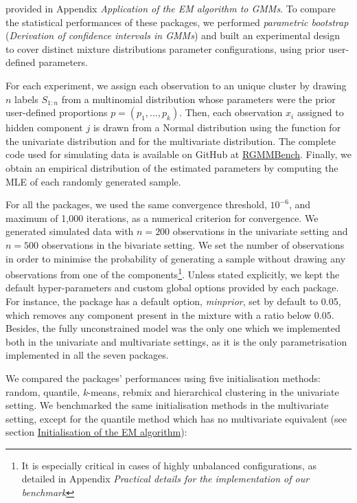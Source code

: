  provided in Appendix \emph{Application of the EM algorithm to GMMs}. To compare the statistical performances of these packages, we performed \emph{parametric bootstrap} (\emph{Derivation of confidence intervals in GMMs}) and built an experimental design to cover distinct mixture distributions parameter configurations, using prior user-defined parameters.

For each experiment, we assign each observation to an unique cluster by drawing \(n\) labels \(S_{1:n}\) from a multinomial distribution whose parameters were the prior user-defined proportions \(p=(p_1, \ldots, p_k)\). Then, each observation \(x_i\) assigned to hidden component \(j\) is drawn from a Normal distribution using the  function for the univariate distribution and  for the multivariate distribution. The complete code used for simulating data is
available on GitHub at \href{https://github.com/bastienchassagnol-servier/RGMMBench}{RGMMBench}. Finally, we obtain an empirical distribution of the estimated parameters by computing the MLE
of each randomly generated sample.

For all the packages, we used the same convergence threshold, \(10^{-6}\), and maximum of 1,000 iterations, as a numerical criterion for convergence. We generated simulated data with \(n = 200\) observations in the univariate setting and \(n = 500\) observations in the bivariate setting. We set the number of observations in order to minimise the probability of generating a sample without drawing any observations from one of the components\footnote{It is especially critical in cases of highly unbalanced configurations, as detailed in Appendix \emph{Practical details for the implementation of our benchmark}}. Unless stated explicitly, we kept the default hyper-parameters and custom global options provided by each package. For instance, the  package has a default option, \emph{minprior}, set by default to 0.05, which removes any component present in the mixture with a ratio below \(0.05\). Besides, the fully unconstrained model was the only one which we implemented both in the univariate and multivariate settings, as it is the only parametrisation implemented in all the seven packages.

We compared the packages' performances using five
initialisation methods: random, quantile, \emph{k}-means, rebmix and hierarchical clustering in the univariate setting. We benchmarked the same initialisation methods in the multivariate setting, except for the quantile method which has no multivariate equivalent (see section \protect\hyperlink{initialisation-of-the-em-algorithm}{Initialisation of the EM algorithm}):


